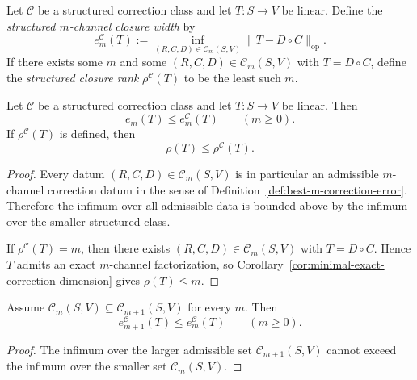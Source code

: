 \begin{definition}
\label{def:structured-closure-width}
Let \(\mathcal C\) be a structured correction class and let \(T:S\to V\) be
linear. Define the \emph{structured \(m\)-channel closure width} by
\[
e_m^{\mathcal C}(T)
:=
\inf_{(R,C,D)\in \mathcal C_m(S,V)}
\|T-D\circ C\|_{\mathrm{op}}.
\]
If there exists some \(m\) and some \((R,C,D)\in \mathcal C_m(S,V)\) with
\(T=D\circ C\), define the \emph{structured closure rank} \(\rho^{\mathcal C}(T)\)
to be the least such \(m\).
\end{definition}

\begin{proposition}
\label{prop:structured-width-lower-envelope}
Let \(\mathcal C\) be a structured correction class and let \(T:S\to V\) be
linear. Then
\[
e_m(T)\le e_m^{\mathcal C}(T)
\qquad (m\ge 0).
\]
If \(\rho^{\mathcal C}(T)\) is defined, then
\[
\rho(T)\le \rho^{\mathcal C}(T).
\]
\end{proposition}

\begin{proof}
Every datum \((R,C,D)\in \mathcal C_m(S,V)\) is in particular an admissible
\(m\)-channel correction datum in the sense of
Definition~\ref{def:best-m-correction-error}. Therefore the infimum over all
admissible data is bounded above by the infimum over the smaller structured
class.

If \(\rho^{\mathcal C}(T)=m\), then there exists
\((R,C,D)\in \mathcal C_m(S,V)\) with \(T=D\circ C\). Hence \(T\) admits an
exact \(m\)-channel factorization, so Corollary~\ref{cor:minimal-exact-correction-dimension}
gives \(\rho(T)\le m\).
\end{proof}

\begin{proposition}
\label{prop:structured-width-monotonicity}
Assume \(\mathcal C_m(S,V)\subseteq \mathcal C_{m+1}(S,V)\) for every \(m\).
Then
\[
e_{m+1}^{\mathcal C}(T)\le e_m^{\mathcal C}(T)
\qquad (m\ge 0).
\]
\end{proposition}

\begin{proof}
The infimum over the larger admissible set \(\mathcal C_{m+1}(S,V)\) cannot
exceed the infimum over the smaller set \(\mathcal C_m(S,V)\).
\end{proof}

